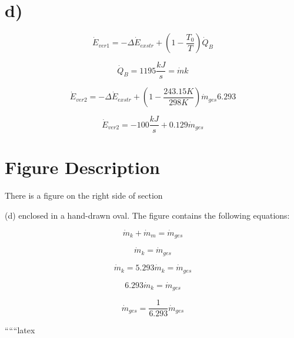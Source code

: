 

\section*{d)}

\[
\dot{E}_{ver1} = -\Delta \dot{E}_{exstr} + \left( 1 - \frac{T_0}{T} \right) \dot{Q}_B
\]

\[
\dot{Q}_B = 1195 \frac{kJ}{s} = \dot{m} k
\]

\[
\dot{E}_{ver2} = -\Delta \dot{E}_{exstr} + \left( 1 - \frac{243.15K}{298K} \right) \dot{m}_{ges} 6.293
\]

\[
\dot{E}_{ver2} = -100 \frac{kJ}{s} + 0.129 \dot{m}_{ges}
\]

\section*{Figure Description}

There is a figure on the right side of section

(d) enclosed in a hand-drawn oval. The figure contains the following equations:

\[
\dot{m}_k + \dot{m}_m = \dot{m}_{ges}
\]

\[
\dot{m}_k = \dot{m}_{ges}
\]

\[
\dot{m}_k = 5.293 \dot{m}_k = \dot{m}_{ges}
\]

\[
6.293 \dot{m}_k = \dot{m}_{ges}
\]

\[
\dot{m}_{ges} = \frac{1}{6.293} \dot{m}_{ges}
\]

``````latex